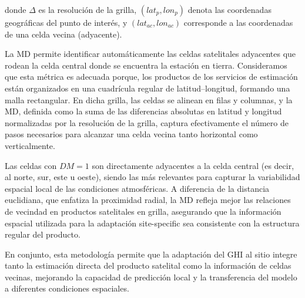 \documentclass[letterpaper,12pt, twoside]{report}
\providecommand{\DIFdeltex}[1]{{\protect\color{red} \scriptsize #1}} %
\providecommand{\DIFdel}[1]{\texorpdfstring{\DIFdeltex{#1}}{}} %
\begin{document}
\DIFdel{donde $\Delta$ es la resolución de la grilla, $(lat_{p}, lon_{p})$ denota las coordenadas geográficas del punto de interés, y $(lat_{ac}, lon_{ac})$ corresponde a las coordenadas de una celda vecina (adyacente).
}%

\DIFdel{La MD permite identificar automáticamente las celdas satelitales adyacentes que rodean la celda central donde se encuentra la estación en tierra. Consideramos que esta métrica es adecuada porque, los productos de los servicios de estimación están organizados en una cuadrícula regular de latitud–longitud, formando una malla rectangular. En dicha grilla, las celdas se alinean en filas y columnas, y la MD, definida como la suma de las diferencias absolutas en latitud y longitud normalizadas por la resolución de la grilla, captura efectivamente el número de pasos necesarios para alcanzar una celda vecina tanto horizontal como verticalmente.}%

\DIFdel{Las celdas con $DM=1$ son directamente adyacentes a la celda central (es decir, al norte, sur, este u oeste), siendo las más relevantes para capturar la variabilidad espacial local de las condiciones atmosféricas. A diferencia de la distancia euclidiana, que enfatiza la proximidad radial, la MD refleja mejor las relaciones de vecindad en productos satelitales en grilla, asegurando que la información espacial utilizada para la adaptación site-specific sea consistente con la estructura regular del producto.}%

\DIFdel{En conjunto, esta metodología permite que la adaptación del GHI al sitio integre tanto la estimación directa del producto satelital como la información de celdas vecinas, mejorando la capacidad de predicción local y la transferencia del modelo a diferentes condiciones espaciales.}%

\end{document}
